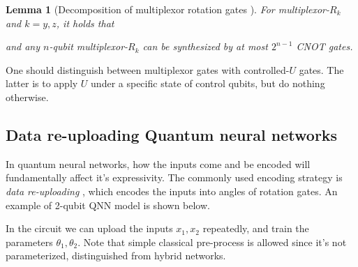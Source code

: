 \documentclass{article}
\theoremstyle{plain}
\newtheorem{lemma}[theorem]{Lemma}
\theoremstyle{definition}
\theoremstyle{remark}
\begin{document}
\begin{lemma}[Decomposition of multiplexor rotation gates \cite{bullock2003,Mottonen2004,Shende2006}]For multiplexor-$R_k$ and $k=y,z$, it holds that

    \begin{center}
    \end{center}
    and any $n$-qubit multiplexor-$R_k$ can be synthesized by at most $2^{n-1}$ CNOT gates. 
    \label{lemma1}
\end{lemma}

One should distinguish between multiplexor gates with controlled-$U$ gates. The latter is to apply $U$ under a specific state of control qubits, but do nothing otherwise.

\subsection{Data re-uploading Quantum neural networks}
In quantum neural networks, how the inputs come and be encoded will fundamentally affect it's expressivity. The commonly used encoding strategy is \textit{data re-uploading} \cite{perez2020,schuld2021,wach2023}, which encodes the inputs into angles of rotation gates. An example of 2-qubit QNN model is shown below.

\begin{center}
    \end{center}
In the circuit we can upload the inputs $x_1,x_2$ repeatedly, and train the parameters $\theta_1, \theta_2$. Note that simple classical pre-process is allowed since it's not parameterized, distinguished from hybrid networks. 
\end{document}
